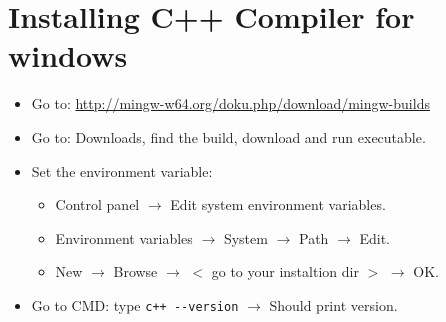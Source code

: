\section{Installing C++ Compiler for windows}
\begin{itemize}
    \item Go to: \url{http://mingw-w64.org/doku.php/download/mingw-builds}
    \item Go to: Downloads, find the build, download and run executable.
    \item Set the environment variable:
        \begin{itemize} %
           \item Control panel $\rightarrow$ Edit system environment variables.
           \item Environment variables $\rightarrow$ System $\rightarrow$ Path $\rightarrow$ Edit.
           \item New $\rightarrow$ Browse $\rightarrow$ $<$ go to your instaltion dir $>$ $\rightarrow$ OK.
        \end{itemize}
    
    \item Go to CMD: type \verb|c++ --version| $\rightarrow$ Should print version.
\end{itemize}

